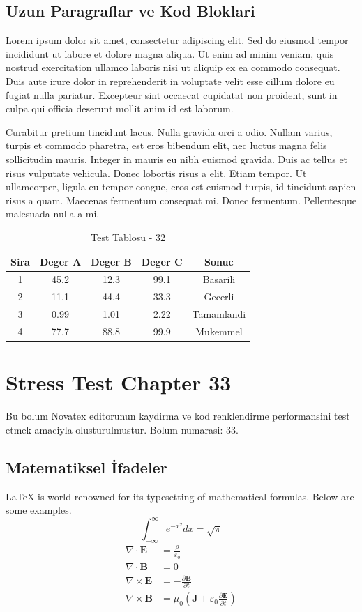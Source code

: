 \documentclass[12pt,a4paper]{article}
\begin{document}
\subsection{Uzun Paragraflar ve Kod Bloklari}
Lorem ipsum dolor sit amet, consectetur adipiscing elit. Sed do eiusmod tempor incididunt ut labore et dolore magna aliqua. Ut enim ad minim veniam, quis nostrud exercitation ullamco laboris nisi ut aliquip ex ea commodo consequat. Duis aute irure dolor in reprehenderit in voluptate velit esse cillum dolore eu fugiat nulla pariatur. Excepteur sint occaecat cupidatat non proident, sunt in culpa qui officia deserunt mollit anim id est laborum.

Curabitur pretium tincidunt lacus. Nulla gravida orci a odio. Nullam varius, turpis et commodo pharetra, est eros bibendum elit, nec luctus magna felis sollicitudin mauris. Integer in mauris eu nibh euismod gravida. Duis ac tellus et risus vulputate vehicula. Donec lobortis risus a elit. Etiam tempor. Ut ullamcorper, ligula eu tempor congue, eros est euismod turpis, id tincidunt sapien risus a quam. Maecenas fermentum consequat mi. Donec fermentum. Pellentesque malesuada nulla a mi.

\begin{table}[h!]
\centering
\begin{tabular}{|c|c|c|c|c|}
\hline
\textbf{Sira} & \textbf{Deger A} & \textbf{Deger B} & \textbf{Deger C} & \textbf{Sonuc} \\
\hline
1 & 45.2 & 12.3 & 99.1 & Basarili \\
2 & 11.1 & 44.4 & 33.3 & Gecerli \\
3 & 0.99 & 1.01 & 2.22 & Tamamlandi \\
4 & 77.7 & 88.8 & 99.9 & Mukemmel \\
\hline
\end{tabular}
\caption{Test Tablosu - 32}
\end{table}

\newpage
\section{Stress Test Chapter 33}
Bu bolum Novatex editorunun kaydirma ve kod renklendirme performansini test etmek amaciyla olusturulmustur. Bolum numarasi: 33.

\subsection{Matematiksel İfadeler}
\LaTeX{} is world-renowned for its typesetting of mathematical formulas. Below are some examples.
\begin{equation}
\int_{-\infty}^{\infty} e^{-x^2} dx = \sqrt{\pi}
\end{equation}
\begin{align}
\nabla \cdot \mathbf{E} &= \frac{\rho}{\varepsilon_0} \\
\nabla \cdot \mathbf{B} &= 0 \\
\nabla \times \mathbf{E} &= -\frac{\partial \mathbf{B}}{\partial t} \\
\nabla \times \mathbf{B} &= \mu_0\left(\mathbf{J} + \varepsilon_0 \frac{\partial \mathbf{E}}{\partial t}\right)
\end{align}
\end{document}
